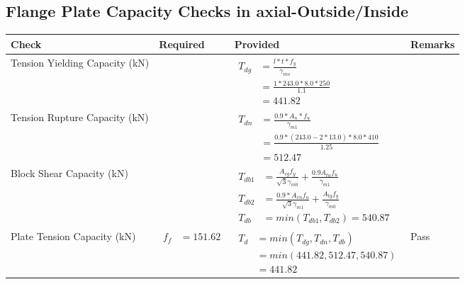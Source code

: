 \documentclass{article}%
\begin{document}
\subsection{Flange Plate Capacity Checks in axial{-}Outside/Inside }%
\label{subsec:FlangePlateCapacityChecksinaxial{-}Outside/Inside}%
\renewcommand{\arraystretch}{1.2}%
\begin{longtable}{|p{4cm}|p{6cm}|p{5.5cm}|p{1.5cm}|}%
\hline%
\rowcolor{OsdagGreen}%
Check&Required&Provided&Remarks\\%
\hline%
\endhead%
\hline%
Tension Yielding Capacity (kN)&&$\begin{aligned} T_{dg} &= \frac{l*t*f_y}{\gamma_{mo}}\\ &=\frac{1*243.0*8.0*250}{1.1}\\ &=441.82\end{aligned}$&\\%
\hline%
Tension Rupture Capacity (kN)&&$\begin{aligned} T_{dn} &= \frac{0.9*A_{n}*f_u}{\gamma_{m1}}\\ &=\frac{0.9*(243.0-2*13.0)*8.0*410}{1.25}\\ &=512.47\end{aligned}$&\\%
\hline%
Block Shear Capacity (kN)&&$\begin{aligned}T_{db1} &= \frac{A_{vg} f_{y}}{\sqrt{3} \gamma_{m0}} + \frac{0.9 A_{tn} f_{u}}{\gamma_{m1}}\\ T_{db2} &= \frac{0.9*A_{vn} f_{u}}{\sqrt{3} \gamma_{m1}} + \frac{A_{tg} f_{y}}{\gamma_{m0}}\\ T_{db} &= min(T_{db1}, T_{db2})= 540.87\end{aligned}$&\\%
\hline%
Plate Tension Capacity (kN)&$\begin{aligned} f_f &=151.62\end{aligned}$&$\begin{aligned} T_d &= min(T_{dg},T_{dn},T_{db})\\ &= min(441.82,512.47,540.87)\\ &=441.82\end{aligned}$&Pass\\%
\hline%
\end{longtable}

%
\newpage%
\end{document}
